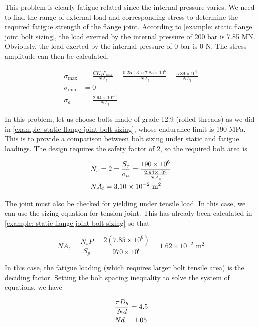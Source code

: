 \documentclass[
10pt,
a4paper,
openany,
svgnames,
]{book}
\begin{document}
\begin{solution}
This problem is clearly fatigue related since the internal pressure varies. We need to find the range of external load and corresponding stress to determine the required fatigue strength of the flange joint. According to \cref{example: static flange joint bolt sizing}, the load exerted by the internal pressure of 200 bar is 7.85 MN. Obviously, the load exerted by the internal pressure of 0 bar is 0 N. The stress amplitude can then be calculated.

\begin{align*}
  \sigma_{\max } &= \frac{CK_fP_{\max}}{NA_t} = \frac{0.25(3)(7.85 \times 10^6}{NA_t} = \frac{5.89 \times 10^6}{NA_t} \\ 
  \sigma_{\min } &= 0 \\ 
  \sigma_a&= \frac{2.94 \times 10^{-6}}{NA_t} 
\end{align*}

In this problem, let us choose bolts made of grade 12.9 (rolled threads) as we did in \cref{example: static flange joint bolt sizing}, whose endurance limit is 190 MPa. This is to provide a comparison between bolt sizing under static and fatigue loadings. The design requires the safety factor of 2, so the required bolt area is

\[\begin{gathered}
  N_s = 2 = \frac{S_e}{\sigma_a} = \frac{190 \times 10^6}{\frac{2.94 \times 10^6}{NA_t}} \hfill \\
  NA_t = 3.10 \times 10^{-2} \text{ m}^2 \hfill \\ 
\end{gathered} \]

The joint must also be checked for yielding under tensile load. In this case, we can use the sizing equation for tension joint. This has already been calculated in \cref{example: static flange joint bolt sizing} so that

\[NA_t = \frac{N_sP}{S_p} = \frac{2(7.85 \times 10^6)}{970 \times 10^6} = 1.62 \times 10^{-2} \text{ m}^2\]

In this case, the fatigue loading (which requires larger bolt tensile area) is the deciding factor. Setting the bolt spacing inequality to solve the system of equations, we have

\begin{gather*}
  \frac{\pi D_b}{Nd} = 4.5 \hfill \\
  Nd = 1.05 \hfill  
\end{gather*} 


\end{solution}
\end{document}
